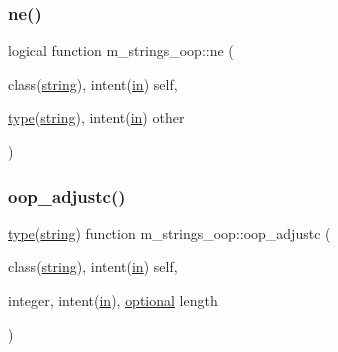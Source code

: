 \subsubsection{\texorpdfstring{ne()}{ne()}}
{\footnotesize\ttfamily logical function m\+\_\+strings\+\_\+oop\+::ne (\begin{DoxyParamCaption}\item[{class(\hyperlink{structm__strings__oop_1_1string}{string}), intent(\hyperlink{M__journal_83_8txt_afce72651d1eed785a2132bee863b2f38}{in})}]{self,  }\item[{\hyperlink{stop__watch_83_8txt_a70f0ead91c32e25323c03265aa302c1c}{type}(\hyperlink{structm__strings__oop_1_1string}{string}), intent(\hyperlink{M__journal_83_8txt_afce72651d1eed785a2132bee863b2f38}{in})}]{other }\end{DoxyParamCaption})\hspace{0.3cm}{\ttfamily [private]}}

\mbox{\label{namespacem__strings__oop_a9fa932c23648e737230553a8e7bfb15b}} 
\subsubsection{\texorpdfstring{oop\+\_\+adjustc()}{oop\_adjustc()}}
{\footnotesize\ttfamily \hyperlink{stop__watch_83_8txt_a70f0ead91c32e25323c03265aa302c1c}{type}(\hyperlink{structm__strings__oop_1_1string}{string}) function m\+\_\+strings\+\_\+oop\+::oop\+\_\+adjustc (\begin{DoxyParamCaption}\item[{class(\hyperlink{structm__strings__oop_1_1string}{string}), intent(\hyperlink{M__journal_83_8txt_afce72651d1eed785a2132bee863b2f38}{in})}]{self,  }\item[{integer, intent(\hyperlink{M__journal_83_8txt_afce72651d1eed785a2132bee863b2f38}{in}), \hyperlink{option__stopwatch_83_8txt_aa4ece75e7acf58a4843f70fe18c3ade5}{optional}}]{length }\end{DoxyParamCaption})\hspace{0.3cm}{\ttfamily [private]}}

\mbox{\label{namespacem__strings__oop_a8e2457b4a1c4489e9600e340fa9ce533}} 
